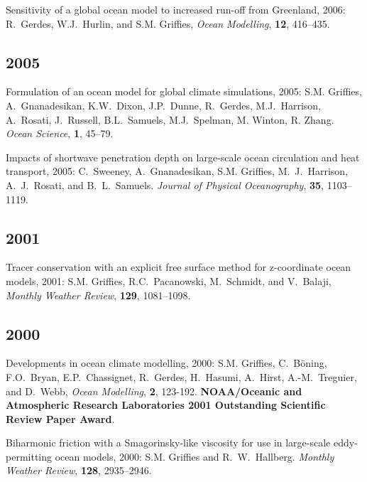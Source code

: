 \begin{etaremune}
\item Sensitivity of a global ocean model to increased run-off from Greenland, 2006: R.\ Gerdes, W.J.\ Hurlin, and S.M. Grif\/f\/ies, {\em Ocean Modelling}, {\bf 12}, 416--435.
  
\subsection*{\sc \color{Maroon} 2005}
  
\item Formulation of an ocean model for global climate simulations, 2005: S.M. Grif\/f\/ies, A.\ Gnanadesikan, K.W.\ Dixon, J.P.\ Dunne, R.\ Gerdes, M.J.\ Harrison, A.\ Rosati, J.\ Russell, B.L.\ Samuels, M.J.\ Spelman, M. Winton, R. Zhang. {\em Ocean Science}, {\bf
1}, 45--79.

\item Impacts of shortwave penetration depth on large-scale ocean circulation and heat transport, 2005: C.\ Sweeney, A.\ Gnanadesikan, S.M. Grif\/f\/ies, M.\ J.\ Harrison, A.\ J.\ Rosati, and B.\ L.\ Samuels.  {\em Journal of Physical Oceanography}, {\bf 35},
1103--1119.

\subsection*{\sc \color{Maroon} 2001}

\item Tracer conservation with an explicit free surface method for z-coordinate ocean models, 2001: 
  S.M. Grif\/f\/ies, R.C.\  Pacanowski, M.\ Schmidt, and V.\ Balaji, {\em Monthly Weather  Review}, {\bf 129}, 1081--1098.

\subsection*{\sc \color{Maroon} 2000}

\item Developments in ocean climate modelling, 2000:  S.M. Grif\/f\/ies, C.\ B\"oning, F.O.\ Bryan, E.P.\ Chassignet, R.\  Gerdes, H.\ Hasumi, A.\ Hirst, A.-M.\ Treguier, and D.\ Webb, {\em Ocean Modelling}, {\bf 2}, 123-192.  {\bf NOAA/Oceanic and Atmospheric Research Laboratories 2001 Outstanding Scientific Review Paper Award}.

\item Biharmonic friction with a  Smagorinsky-like viscosity for use in large-scale eddy-permitting ocean models, 2000: S.M. Grif\/f\/ies and R.\ W.\ Hallberg.  {\em Monthly Weather Review}, {\bf 128}, 2935--2946.


\end{etaremune}
